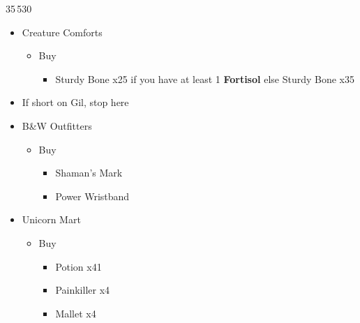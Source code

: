 \begin{multicols}{2}
\begin{shop}{35\,530}
\begin{itemize}
    \item Creature Comforts
    \begin{itemize}
        \item Buy
        \begin{itemize}
            \item Sturdy Bone x25 if you have at least 1 \textbf{Fortisol} else Sturdy Bone x35
        \end{itemize}
    \end{itemize}
    \item If short on Gil, stop here
    \item B\&W Outfitters
    \begin{itemize}
        \item Buy
        \begin{itemize}
            \item Shaman's Mark
            \item Power Wristband
        \end{itemize}
    \end{itemize}
    \item Unicorn Mart
    \begin{itemize}
        \item Buy
        \begin{itemize}
            \item Potion x41
            \item Painkiller x4
            \item Mallet x4
        \end{itemize}
    \end{itemize}
\end{itemize}
\end{shop}


\end{multicols}
